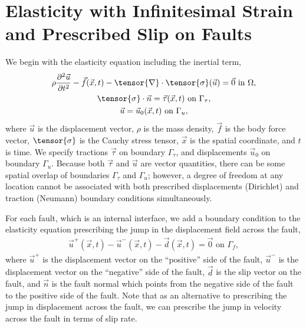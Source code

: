 \section{Elasticity with Infinitesimal Strain and Prescribed Slip on Faults}

We begin with the elasticity equation including the inertial term,
\begin{gather}
  \label{eqn:elasticity:strong:form}
  \rho \frac{\partial^2\vec{u}}{\partial t^2} - \vec{f}(\vec{x},t) - \tensor{\nabla} \cdot 
\tensor{\sigma}
(\vec{u}) = \vec{0} \text{ in }\Omega, \\
%
  \label{eqn:bc:Neumann}
  \tensor{\sigma} \cdot \vec{n} = \vec{\tau}(\vec{x},t) \text{ on }\Gamma_\tau, \\
%
  \label{eqn:bc:Dirichlet}
  \vec{u} = \vec{u}_0(\vec{x},t) \text{ on }\Gamma_u,
\end{gather}
where $\vec{u}$ is the displacement vector, $\rho$ is the mass
density, $\vec{f}$ is the body force vector, $\tensor{\sigma}$ is the
Cauchy stress tensor, $\vec{x}$ is the spatial coordinate, and $t$ is
time. We specify tractions $\vec{\tau}$ on boundary $\Gamma_\tau$, and
displacements $\vec{u}_0$ on boundary $\Gamma_u$. Because both $\vec{\tau}$
and $\vec{u}$ are vector quantities, there can be some spatial overlap
of boundaries $\Gamma_\tau$ and $\Gamma_u$; however, a degree of freedom at
any location cannot be associated with both prescribed displacements
(Dirichlet) and traction (Neumann) boundary conditions simultaneously.

For each fault, which is an internal interface, we add a boundary
condition to the elasticity equation prescribing the jump in the
displacement field across the fault,
\begin{gather}
  \label{eqn:bc:prescribed_slip}
  \vec{u}^+(\vec{x},t) - \vec{u}^-(\vec{x},t) - \vec{d}(\vec{x},t) = \vec{0} \text{ on }\Gamma_f,
\end{gather}
where $\vec{u}^+$ is the displacement vector on the ``positive'' side
of the fault, $\vec{u}^-$ is the displacement vector on the
``negative'' side of the fault, $\vec{d}$ is the slip vector on the
fault, and $\vec{n}$ is the fault normal which points from the
negative side of the fault to the positive side of the fault. Note
that as an alternative to prescribing the jump in displacement across
the fault, we can prescribe the jump in velocity across the fault in
terms of slip rate. 

